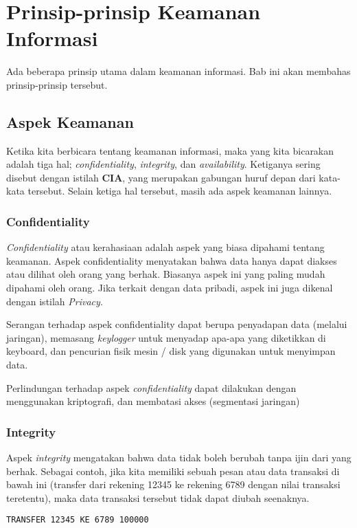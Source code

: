 \chapter{Prinsip-prinsip Keamanan Informasi}

Ada beberapa prinsip utama dalam keamanan informasi.
Bab ini akan membahas prinsip-prinsip tersebut.


\section{Aspek Keamanan}
Ketika kita berbicara tentang keamanan informasi, maka yang kita
bicarakan adalah tiga hal;
{\em confidentiality}, {\em integrity}, dan {\em availability}.
Ketiganya sering disebut dengan istilah \textbf{CIA},
yang merupakan gabungan huruf depan dari kata-kata tersebut.
Selain ketiga hal tersebut, masih ada aspek keamanan lainnya.

\subsection{Confidentiality}
{\em Confidentiality} atau kerahasiaan adalah aspek yang biasa dipahami
tentang keamanan.
Aspek confidentiality menyatakan bahwa data hanya dapat diakses
atau dilihat oleh orang yang berhak.
Biasanya aspek ini yang paling mudah dipahami oleh orang.
Jika terkait dengan data pribadi, aspek ini juga dikenal dengan
istilah {\em Privacy}.

Serangan terhadap aspek confidentiality dapat berupa
penyadapan data (melalui jaringan),
memasang {\em keylogger} untuk menyadap apa-apa yang diketikkan
di keyboard,
dan pencurian fisik mesin / disk yang digunakan untuk menyimpan data.

Perlindungan terhadap aspek {\em confidentiality} dapat dilakukan
dengan menggunakan kriptografi, 
dan membatasi akses (segmentasi jaringan)


\subsection{Integrity}
Aspek {\em integrity} mengatakan bahwa data tidak boleh berubah
tanpa ijin dari yang berhak.
Sebagai contoh, jika kita memiliki sebuah pesan atau data 
transaksi di bawah ini (transfer dari rekening 12345 ke rekening 6789 
dengan nilai transaksi teretentu), 
maka data transaksi tersebut tidak dapat diubah seenaknya.

\begin{verbatim}
TRANSFER 12345 KE 6789 100000
\end{verbatim}


